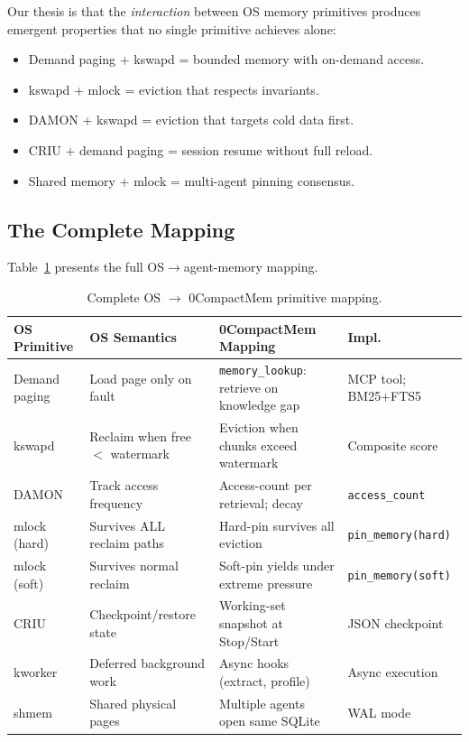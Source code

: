 \documentclass[10pt,twocolumn]{article}
\begin{document}
Our thesis is that the \emph{interaction} between OS memory primitives produces emergent properties that no single primitive achieves alone:
\begin{itemize}[leftmargin=*,nosep]
  \item Demand paging + kswapd = bounded memory with on-demand access.
  \item kswapd + mlock = eviction that respects invariants.
  \item DAMON + kswapd = eviction that targets cold data first.
  \item CRIU + demand paging = session resume without full reload.
  \item Shared memory + mlock = multi-agent pinning consensus.
\end{itemize}

\subsection{The Complete Mapping}

Table~\ref{tab:mapping} presents the full OS$\to$agent-memory mapping.

\begin{table}[t]
\centering
\caption{Complete OS $\to$ 0CompactMem primitive mapping.}
\label{tab:mapping}
\footnotesize
\begin{tabular}{lp{4.2cm}p{4.8cm}p{3cm}}
\toprule
\textbf{OS Primitive} & \textbf{OS Semantics} & \textbf{0CompactMem Mapping} & \textbf{Impl.} \\
\midrule
Demand paging & Load page only on fault & \texttt{memory\_lookup}: retrieve on knowledge gap & MCP tool; BM25+FTS5 \\
\addlinespace
kswapd & Reclaim when free $<$ watermark & Eviction when chunks exceed watermark & Composite score \\
\addlinespace
DAMON & Track access frequency & Access-count per retrieval; decay & \texttt{access\_count} \\
\addlinespace
mlock (hard) & Survives ALL reclaim paths & Hard-pin survives all eviction & \texttt{pin\_memory(hard)} \\
\addlinespace
mlock (soft) & Survives normal reclaim & Soft-pin yields under extreme pressure & \texttt{pin\_memory(soft)} \\
\addlinespace
CRIU & Checkpoint/restore state & Working-set snapshot at Stop/Start & JSON checkpoint \\
\addlinespace
kworker & Deferred background work & Async hooks (extract, profile) & Async execution \\
\addlinespace
shmem & Shared physical pages & Multiple agents open same SQLite & WAL mode \\
\bottomrule
\end{tabular}
\end{table}
\end{document}
